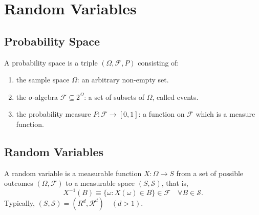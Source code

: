 \chapter{Random Variables}


\section{Probability Space}

\begin{definition}
	A probability space is a triple $(\Omega,\mathcal{F},P)$ consisting of:
	\begin{enumerate}
		\item the sample space $\Omega$: an arbitrary non-empty set.
		\item the $\sigma$-algebra $\mathcal{F}\subseteq 2^{\Omega}$: a set of subsets of $\Omega$, called events.
		\item the probability measure $P:\mathcal{F} \rightarrow[0,1]$: a function on $\mathcal{F}$ which is a measure function.
	\end{enumerate}
\end{definition}

\section{Random Variables}

\begin{definition}
	A random variable is a measurable function $X:\Omega\rightarrow S$ from a set of possible outcomes $(\Omega,\mathcal{F})$ to a measurable space $(S,\mathcal{S})$, that is,
	\begin{equation}
		X^{-1}(B)\equiv\{\omega:X(\omega)\in B\}\in\mathcal{F}\quad \forall B\in\mathcal{S}.
	\end{equation}
	Typically, $(S,\mathcal{S})=(R^d,\mathcal{R}^d)\quad(d>1)$.
\end{definition}

